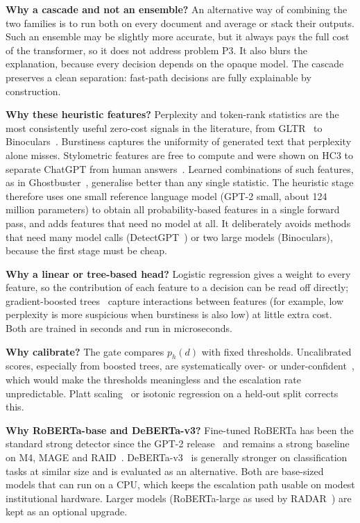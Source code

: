 \textbf{Why a cascade and not an ensemble?} An alternative way of combining
the two families is to run both on every document and average or stack their
outputs. Such an ensemble may be slightly more accurate, but it always pays
the full cost of the transformer, so it does not address problem P3. It also
blurs the explanation, because every decision depends on the opaque model.
The cascade preserves a clean separation: fast-path decisions are fully
explainable by construction.

\textbf{Why these heuristic features?} Perplexity and token-rank statistics are
the most consistently useful zero-cost signals in the literature, from
GLTR~\cite{gehrmann2019gltr} to Binoculars~\cite{hans2024binoculars}.
Burstiness captures the uniformity of generated text that perplexity alone
misses. Stylometric features are free to compute and were shown on HC3 to
separate ChatGPT from human answers~\cite{guo2023hc3}. Learned combinations of
such features, as in Ghostbuster~\cite{verma2024ghostbuster}, generalise better
than any single statistic. The heuristic stage therefore uses one small
reference language model (GPT-2 small, about 124 million parameters) to obtain
all probability-based features in a single forward pass, and adds features that
need no model at all. It deliberately avoids methods that need many model calls
(DetectGPT~\cite{mitchell2023detectgpt}) or two large models
(Binoculars), because the first stage must be cheap.

\textbf{Why a linear or tree-based head?} Logistic regression gives a weight to
every feature, so the contribution of each feature to a decision can be read
off directly; gradient-boosted trees~\cite{chen2016xgboost} capture
interactions between features (for example, low perplexity is more suspicious
when burstiness is also low) at little extra cost. Both are trained in
seconds and run in microseconds.

\textbf{Why calibrate?} The gate compares $p_h(d)$ with fixed thresholds.
Uncalibrated scores, especially from boosted trees, are systematically
over- or under-confident~\cite{guo2017calibration}, which would make the
thresholds meaningless and the escalation rate unpredictable. Platt
scaling~\cite{platt1999probabilistic} or isotonic regression on a held-out
split corrects this.

\textbf{Why RoBERTa-base and DeBERTa-v3?} Fine-tuned RoBERTa has been the
standard strong detector since the GPT-2 release~\cite{solaiman2019release} and
remains a strong baseline on M4, MAGE and RAID~\cite{wang2024m4,li2024mage,
dugan2024raid}. DeBERTa-v3~\cite{he2023debertav3} is generally stronger on
classification tasks at similar size and is evaluated as an alternative. Both
are base-sized models that can run on a CPU, which keeps the escalation path
usable on modest institutional hardware. Larger models (RoBERTa-large as used by
RADAR~\cite{hu2023radar}) are kept as an optional upgrade.

